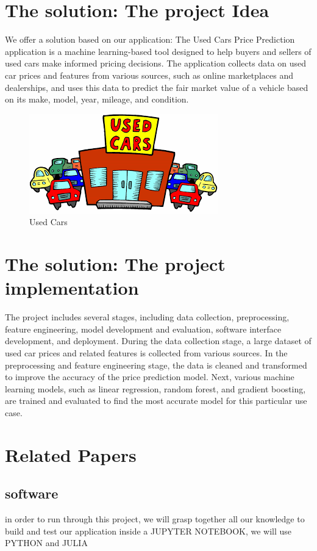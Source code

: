 \documentclass[]{report}   %
\begin{document}
\section{The solution: The project Idea}    %
We offer a solution based on our application:
The Used Cars Price Prediction application is a machine learning-based tool designed to help buyers and sellers of used cars make informed pricing decisions.
The application collects data on used car prices and features from various sources, such as online marketplaces and dealerships, and uses this data to predict the fair market value of a vehicle 
based on its make, model, year, mileage, and condition.
\begin{figure}[H]
\centering
\includegraphics[width = 0.5 \linewidth]{used_cars.jpg}
\caption{Used Cars} \label{exemple-ref-img}
\end{figure}
  

\section{The solution: The project implementation}    %
The project includes several stages, including data collection, preprocessing, feature engineering, model development and evaluation, software interface development, and deployment.
During the data collection stage, a large dataset of used car prices and related features is collected from various sources.
In the preprocessing and feature engineering stage, the data is cleaned and transformed to improve the accuracy of the price prediction model.
Next, various machine learning models, such as linear regression, random forest, and gradient boosting, are trained and evaluated to find the most accurate model for this particular use case. 
\section{Related Papers}     %
\subsection{software}
in order to run through this project, we will grasp together all our knowledge to build and test our application inside a JUPYTER NOTEBOOK, we will use PYTHON and JULIA
\end{document}
